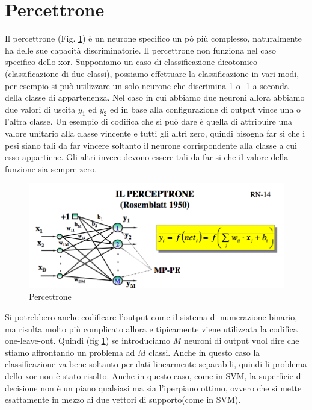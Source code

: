 \section{Percettrone}
\noindent Il percettrone (Fig. \ref{percet}) è un neurone specifico un pò più complesso, naturalmente ha delle sue capacità discriminatorie. Il percettrone non funziona nel caso specifico dello xor. Supponiamo un caso di classificazione dicotomico (classificazione di due classi), possiamo effettuare la classificazione in vari modi, per esempio si può utilizzare un solo neurone che discrimina 1 o -1 a seconda della classe di appartenenza. Nel caso in cui abbiamo due neuroni allora abbiamo due valori di uscita $y_1$ ed $y_2$ ed in base alla configurazione di output vince una o l'altra classe. Un esempio di codifica che si può dare è quella di attribuire una valore unitario alla classe vincente e tutti gli altri zero, quindi bisogna far si che i pesi siano tali da far vincere soltanto il neurone corrispondente alla classe a cui esso appartiene. Gli altri invece devono essere tali da far si che il valore della funzione sia sempre zero.
\begin{figure}
\centering
\includegraphics[scale=0.5]{img/percettrone.png}
\caption{Percettrone}
\label{percet}
\end{figure}
Si potrebbero anche codificare l'output come il sistema di numerazione binario, ma risulta molto più complicato allora e tipicamente viene utilizzata la codifica one-leave-out.  Quindi (fig \ref{percet}) se introduciamo $M$ neuroni di output vuol dire che stiamo affrontando un problema ad $M$ classi. Anche in questo caso la classificazione va bene soltanto per dati linearmente separabili, quindi li problema dello xor non è stato risolto. Anche in questo caso, come in SVM,  la superficie di decisione non è un piano qualsiasi ma sia l'iperpiano ottimo, ovvero che si mette esattamente in mezzo ai due vettori di supporto(come in SVM). 

